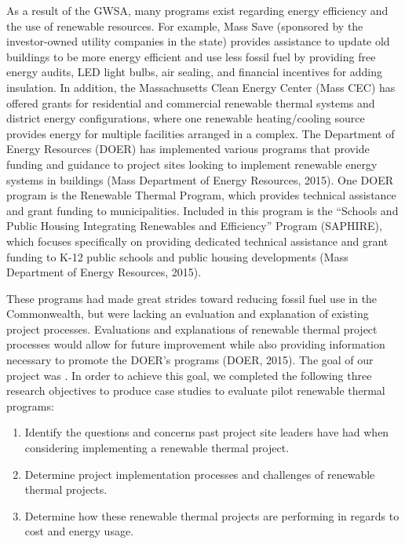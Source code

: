 \par As a result of the GWSA, many programs exist regarding energy efficiency and the use of renewable resources. For example, Mass Save (sponsored by the investor-owned utility companies in the state) provides assistance to update old buildings to be more energy efficient and use less fossil fuel by providing free energy audits, LED light bulbs, air sealing, and financial incentives for adding insulation. In addition, the Massachusetts Clean Energy Center (Mass CEC) has offered grants for residential and commercial renewable thermal systems and district energy configurations, where one renewable heating/cooling source provides energy for multiple facilities arranged in a complex. The Department of Energy Resources (DOER) has implemented various programs that provide funding and guidance to project sites looking to implement renewable energy systems in buildings (Mass Department of Energy Resources, 2015). One DOER program is the Renewable Thermal Program, which provides technical assistance and grant funding to municipalities. Included in this program is the “Schools and Public Housing Integrating Renewables and Efficiency” Program (SAPHIRE), which focuses specifically on providing dedicated technical assistance and grant funding to K-12 public schools and public housing developments (Mass Department of Energy Resources, 2015).
\par These programs had made great strides toward reducing fossil fuel use in the Commonwealth, but were lacking an evaluation and explanation of existing project processes. Evaluations and explanations of renewable thermal project processes would allow for future improvement while also providing information necessary to promote the DOER’s programs (DOER, 2015). The goal of our project was \goal. In order to achieve this goal, we completed the following three research objectives to produce case studies to evaluate pilot renewable thermal programs:
\begin{enumerate}
  \item{Identify the questions and concerns past project site leaders have had when considering implementing a renewable thermal project.}
  \item{Determine project implementation processes and challenges of renewable thermal projects.}
  \item{Determine how these renewable thermal projects are performing in regards to cost and energy usage.}
\end{enumerate}

